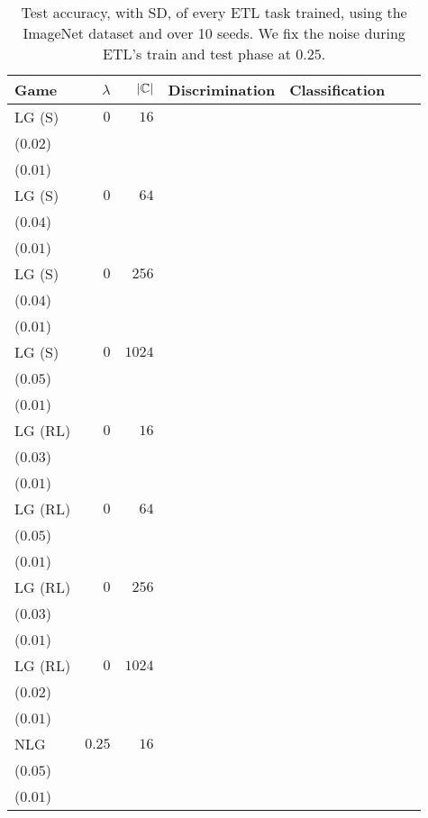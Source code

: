 \begin{table*}[t]
\linespread{0.6}\selectfont\centering
\centering
\caption{Test accuracy, with SD, of every ETL task trained, using the ImageNet dataset and over 10 seeds. We fix the noise during ETL's train and test phase at \(0.25\).}
\label{table:etl_imagenet_025_eval}
\begin{tabular}{lrrrrrr}
\toprule
Game & \(\lambda\) & \(|\mathcal{{\mathbb{C}}}|\) & \multicolumn{1}{c}{Discrimination} & \multicolumn{1}{c}{Classification} \\[1ex]
\midrule
LG {\scriptsize(S)} & \(0\) & \(16\) & \longcell{\(0.13\)\\{\tiny(\(0.02\))}} & \longcell{\(0.06\)\\{\tiny(\(0.01\))}} \\[2.2ex]
LG {\scriptsize(S)} & \(0\) & \(64\) & \longcell{\(0.19\)\\{\tiny(\(0.04\))}} & \longcell{\(0.08\)\\{\tiny(\(0.01\))}} \\[2.2ex]
LG {\scriptsize(S)} & \(0\) & \(256\) & \longcell{\(0.24\)\\{\tiny(\(0.04\))}} & \longcell{\(0.09\)\\{\tiny(\(0.01\))}} \\[2.2ex]
LG {\scriptsize(S)} & \(0\) & \(1024\) & \longcell{\(0.36\)\\{\tiny(\(0.05\))}} & \longcell{\(0.10\)\\{\tiny(\(0.01\))}} \\[2.2ex]
LG {\scriptsize(RL)} & \(0\) & \(16\) & \longcell{\(0.23\)\\{\tiny(\(0.03\))}} & \longcell{\(0.06\)\\{\tiny(\(0.01\))}} \\[2.2ex]
LG {\scriptsize(RL)} & \(0\) & \(64\) & \longcell{\(0.43\)\\{\tiny(\(0.05\))}} & \longcell{\(0.08\)\\{\tiny(\(0.01\))}} \\[2.2ex]
LG {\scriptsize(RL)} & \(0\) & \(256\) & \longcell{\(0.59\)\\{\tiny(\(0.03\))}} & \longcell{\(0.10\)\\{\tiny(\(0.01\))}} \\[2.2ex]
LG {\scriptsize(RL)} & \(0\) & \(1024\) & \longcell{\(0.67\)\\{\tiny(\(0.02\))}} & \longcell{\(0.11\)\\{\tiny(\(0.01\))}} \\[2.2ex]
NLG & \(0.25\) & \(16\) & \longcell{\(0.26\)\\{\tiny(\(0.05\))}} & \longcell{\(0.06\)\\{\tiny(\(0.01\))}} \\[2.2ex]

\end{tabular}
\end{table*}

